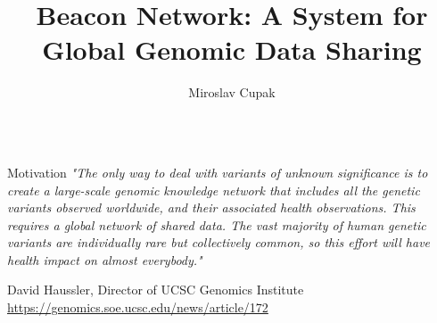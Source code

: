 \documentclass{beamer}
\author[Advisor: Ing. Matej Lexa, Ph.D.]{Miroslav Cupak}
\title{Beacon Network: A System for Global Genomic Data Sharing}
\institute{Faculty of Informatics, Masaryk University, Brno, Czech Republic}
\begin{document}
\begin{frame}[fragile]

\begin{columns}[T]
\begin{column}{.32\textwidth}

\begin{block}{Motivation\hfill{}}
\textit{"The only way to deal with variants of unknown significance is to create a large-scale genomic knowledge network that includes all the genetic variants observed worldwide, and their associated health observations. This requires a global network of shared data. The vast majority of human genetic variants are individually rare but collectively common, so this effort will have health impact on almost everybody."}
\begin{flushright}
David Haussler, Director of UCSC Genomics Institute
\\\footnotesize \url{https://genomics.soe.ucsc.edu/news/article/172}
\end{flushright}
\vspace{-2mm}


\end{block}
\end{column}
\end{columns}
\end{frame}
\end{document}
